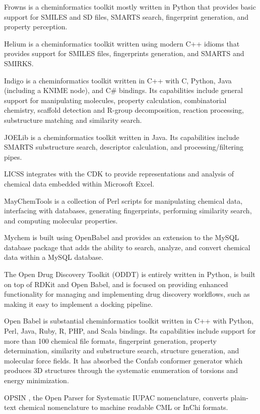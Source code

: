 Frowns is a cheminformatics toolkit mostly written in Python that provides basic support for SMILES and SD files, SMARTS search, fingerprint generation, and property perception.

Helium is a cheminformatics toolkit written using modern C++ idioms that provides support for SMILES files, fingerprints generation, and SMARTS and SMIRKS.

Indigo \cite{Pavlov_2011} is a cheminformatics toolkit written in C++ with C, Python, Java (including a KNIME node), and C\# bindings.  Its capabilities include general support for manipulating molecules, property calculation, combinatorial chemistry, scaffold detection and R-group decomposition, reaction processing, substructure matching and similarity search.

JOELib is a cheminformatics toolkit written in Java. Its capabilities include SMARTS substructure search, descriptor calculation, and processing/filtering pipes.

LICSS \cite{Lawson_2012} integrates with the CDK to provide representations and analysis of chemical data embedded within Microsoft Excel.

MayChemTools is a collection of Perl scripts for manipulating chemical data, interfacing with databases, generating fingerprints, performing similarity search, and computing molecular properties.

Mychem is built using OpenBabel and provides an extension to the MySQL database package that adds the ability to search, analyze, and convert chemical data within a MySQL database.

The Open Drug Discovery Toolkit (ODDT) \cite{W_jcikowski_2015} is entirely written in Python, is built on top of RDKit and Open Babel, and is focused on providing enhanced functionality for managing and implementing drug discovery workflows, such as making it easy to implement a docking pipeline. 

Open Babel \cite{O_Boyle_2011} is substantial cheminformatics toolkit written in C++ with Python, Perl, Java, Ruby, R, PHP, and Scala bindings.  Its capabilities include support for more than 100 chemical file formats, fingerprint generation, property determination, similarity and substructure search, structure generation, and molecular force fields.  It has absorbed the Confab \cite{confab} conformer generator which produces 3D structures through the systematic enumeration of torsions and energy minimization.

OPSIN \cite{Lowe_2011}, the Open Parser for Systematic IUPAC nomenclature, converts plain-text chemical nomenclature to machine readable CML or InChi formats.

